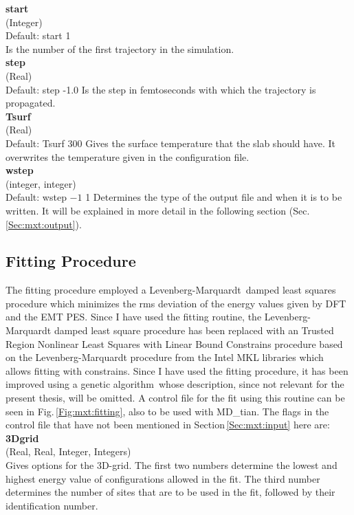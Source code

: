 \documentclass[twoside, 11pt, titlepage, captions=nooneline, a4paper, headsepline]{scrbook}%
\newcommand{\9}{\mathrm}
\newcommand{\0}{\,\mathrm}
\begin{document}
\noindent\textbf{start}\\ 
(Integer)\\
Default: start 1\\
Is the number of the first trajectory in the simulation.\\

\noindent\textbf{step}\\ 
(Real)\\
Default: step -1.0
Is the step in femtoseconds with which the trajectory is propagated.\\

\noindent\textbf{Tsurf}\\ 
(Real)\\ 
Default: Tsurf 300
Gives the surface temperature that the slab should have. It overwrites the temperature given in the configuration file.\\

\noindent\textbf{wstep}\\
(integer, integer)\\ 
Default: wstep $-1$ 1
Determines the type of the output file and when it is to be written. It will be explained in more detail in the following section (Sec.\,\ref{Sec:mxt:output}).\\


\subsection{Fitting Procedure}
The fitting procedure employed a Levenberg-Marquardt\,\cite{Levenberg1944,Marquardt1963} damped least squares procedure which minimizes the rms deviation of the energy values given by DFT and the EMT PES. Since I have used the fitting routine, the Levenberg-Marquardt damped least square procedure has been replaced with an Trusted Region Nonlinear Least Squares with Linear Bound Constrains procedure based on the Levenberg-Marquardt procedure from the Intel MKL libraries which allows fitting with constrains. Since I have used the fitting procedure, it has been improved using a genetic algorithm\,\cite{marvinmaster,marvinpc} whose description, since not relevant for the present thesis, will be omitted. A control file for the fit using this routine can be seen in Fig.\,\ref{Fig:mxt:fitting}, also to be used with MD\_tian. The flags in the control file that have not been mentioned in Section\,\ref{Sec:mxt:input} here are:\\

\noindent\textbf{3Dgrid}\\
(Real, Real, Integer, Integers)\\
Gives options for the 3D-grid. The first two numbers determine the lowest and highest energy value of configurations allowed in the fit. The third number determines the number of sites that are to be used in the fit, followed by their identification number.\\
\end{document}

